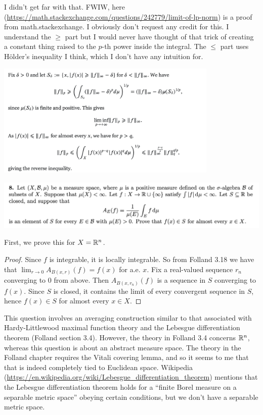 I didn't get far with that. FWIW, here (\url{https://math.stackexchange.com/questions/242779/limit-of-lp-norm}) is a proof from
math.stackexchange. I obviously don't request any credit for this. I understand the $\geq$ part but
I would never have thought of that trick of creating a constant thing raised to the $p$-th power
inside the integral. The $\leq$ part uses Hölder's inequality I think, which I don't have any
intuition for.
\begin{mdframed}
\includegraphics[width=300pt]{img/analysis--berkeley-202a-final-1b8f.png}
\end{mdframed}


\newpage
\begin{mdframed}
  \includegraphics[width=400pt]{img/analysis--berkeley-202a-final-8aed.png}
\end{mdframed}

First, we prove this for $X = \mathbb{R}^n$.

\begin{proof}
  Since $f$ is integrable, it is locally integrable. So from Folland 3.18 we have
  that $\lim_{r \to 0} A_{B(x, r)}(f) = f(x)$ for a.e. $x$. Fix a real-valued sequence $r_n$ converging
  to $0$ from above. Then $A_{B(x, r_n)}(f)$ is a sequence in $S$ converging to $f(x)$. Since $S$
  is closed, it contains the limit of every convergent sequence in $S$, hence $f(x) \in S$ for
  almost every $x \in X$.
\end{proof}

\begin{remark*}
  This question involves an averaging construction similar to that associated with Hardy-Littlewood
  maximal function theory and the Lebesgue differentiation theorem (Folland section 3.4). However,
  the theory in Folland 3.4 concerns $\mathbb{R}^n$, whereas this question is about an abstract measure
  space. The theory in the Folland chapter requires the Vitali covering lemma, and so it seems to
  me that that is indeed completely tied to Euclidean space. Wikipedia
  (\url{https://en.wikipedia.org/wiki/Lebesgue_differentiation_theorem}) mentions that the Lebesgue differentiation theorem holds for
  a ``finite Borel measure on a separable metric space​'' obeying certain conditions, but we don't
  have a separable metric space.
\end{remark*}

